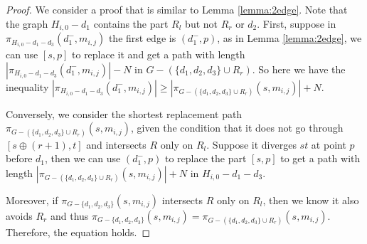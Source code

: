 \documentclass[11pt]{article}
\theoremstyle{plain}
\theoremstyle{definition}
\newcommand{\set}[1]{\{ #1 \}}
\newcommand{\og}[3]{\pi_{G-#3}\left(#1,#2\right)}
\begin{document}
\begin{center}
    


 \end{center}



\begin{proof}
    We consider a proof that is similar to Lemma \ref{lemma:2edge}. Note that the graph $H_{i,0}-d_1$ contains the part $R_l$ but not $R_r$ or $d_2$. First, suppose in $\pi_{H_{i,0}-d_1-d_3}(d_1^-,m_{i,j})$ the first edge is $(d_1^-,p)$, as in Lemma \ref{lemma:2edge}, we can use $[s,p]$ to replace it and get a path with length $|\pi_{H_{i,0}-d_1-d_3}(d_1^-,m_{i,j})| - N$ in $G-(\set{d_1, d_2, d_3} \cup R_r)$. So here we have the inequality $|\pi_{H_{i,0}-d_1-d_3}(d_1^-,m_{i,j})| \geq |\og{s}{m_{i,j}}{(\set{d_1, d_2, d_3} \cup R_r)}| + N$.
    
    Conversely, we consider the shortest replacement path $\og{s}{m_{i,j}}{(\set{d_1, d_2, d_3} \cup R_r)}$, given the condition that it {does not go through $[s \oplus (r+1),t]$ and} intersects $R$ only on $R_l$. Suppose it diverges $st$ at point $p$ before $d_1$, then we can use $(d_1^-,p)$ to replace the part $[s,p]$ to get a path with length $|\og{s}{m_{i,j}}{(\set{d_1, d_2, d_3} \cup R_r)}| + N$ in $H_{i,0}-d_1-d_3$.

    

    Moreover, if $\og{s}{m_{i,j}}{\set{d_1, d_2, d_3}}$ intersects $R$ only on $R_l$, then we know it also avoids $R_r$ and thus $\og{s}{m_{i,j}}{\set{d_1, d_2, d_3}} = \og{s}{m_{i,j}}{(\set{d_1, d_2, d_3} \cup R_r)}$. Therefore, the equation holds.
\end{proof}
\end{document}
